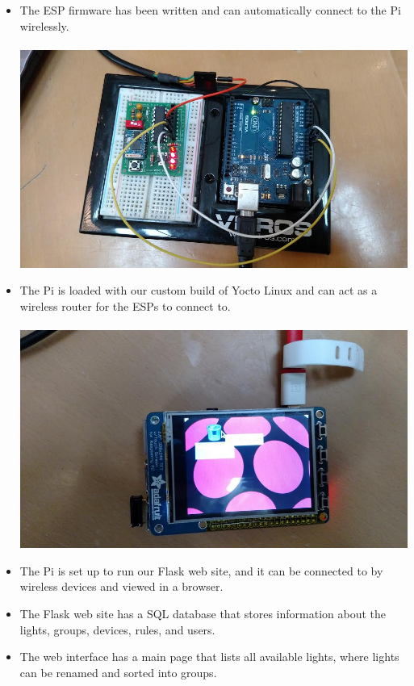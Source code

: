 \documentclass[oneside,openright]{book}
\begin{document}
\begin{itemize}
    \item The ESP firmware has been written and can automatically connect to
        the Pi wirelessly. \\ \\
      \includegraphics[width=1.0\textwidth]{pi-esp.png}
    \item The Pi is loaded with our custom build of Yocto Linux and can act as
        a wireless router for the ESPs to connect to. \\ \\
      \includegraphics[width=1.0\textwidth]{pi-screen.png}
    \item The Pi is set up to run our Flask web site, and it can be connected 
        to by wireless devices and viewed in a browser.
    \item The Flask web site has a SQL database that stores information about
        the lights, groups, devices, rules, and users.
    \item The web interface has a main page that lists all available lights,
        where lights can be renamed and sorted into groups. \\ \\

\end{itemize}
\end{document}
